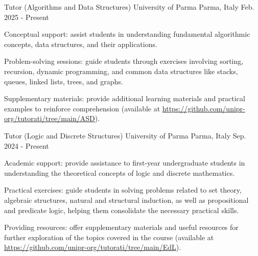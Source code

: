 

\begin{cventries}

    \cventry
    {Tutor (Algorithms and Data Structures)} %
    {University of Parma} %
    {Parma, Italy} %
    {Feb. 2025 - Present} %
    {
    \begin{cvitems} %
        \item Conceptual support: assist students in understanding fundamental algorithmic concepts, data structures, and their applications.
        \item Problem-solving sessions: guide students through exercises involving sorting, recursion, dynamic programming, and common data structures like stacks, queues, linked lists, trees, and graphs.
        \item Supplementary materials: provide additional learning materials and practical examples to reinforce comprehension (available at \url{https://github.com/unipr-org/tutorati/tree/main/ASD}).
    \end{cvitems}
    }

	\cventry
	{Tutor (Logic and Discrete Structures)} %
	{University of Parma} %
	{Parma, Italy} %
	{Sep. 2024 - Present} %
	{
	\begin{cvitems} %
		\item Academic support: provide assistance to first-year undergraduate students in understanding the theoretical concepts of logic and discrete mathematics. 
		\item Practical exercises: guide students in solving problems related to set theory, algebraic structures, natural and structural induction, as well as propositional and predicate logic, helping them consolidate the necessary practical skills.
		\item Providing resources: offer supplementary materials and useful resources for further exploration of the topics covered in the course (available at \url{https://github.com/unipr-org/tutorati/tree/main/EdL}).
	\end{cvitems}
	}


\end{cventries}
